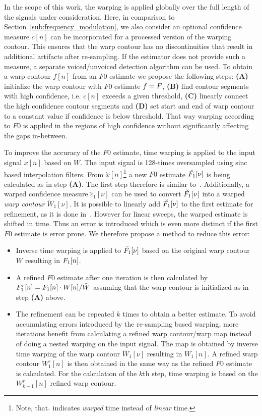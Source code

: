 In the scope of this work, the warping is applied globally over the full length of the signals under consideration. Here, in comparison to Section~\ref{sub:frequency_modulation}, we also consider an optional confidence measure $c[n]$ can be incorporated for a processed version of the warping contour. This ensures that the warp contour has no discontinuities that result in additional artifacts after re-sampling. If the estimator does not provide such a measure, a separate voiced/unvoiced detection algorithm can be used. To obtain a warp contour $f[n]$ from an $F0$ estimate we propose the following steps: \textbf{(A)} initialize the warp contour with $F0$ estimate $f = {F}$, \textbf{(B)} find contour segments with high confidence, i.e. $c[n]$ exceeds a given threshold, \textbf{(C)} linearly connect the high confidence contour segments and \textbf{(D)} set start and end of warp contour to a constant value if confidence is below threshold. That way warping according to $F0$ is applied in the regions of high confidence without significantly affecting the gaps in-between.
\par
To improve the accuracy of the $F0$ estimate, time warping is applied to the input signal $x[n]$ based on $W$. The input signal is 128-times oversampled using sinc based interpolation filters.
From $\breve{x}[n]$\footnote{Note, that $\breve{}$ indicates \emph{warped} time instead of \emph{linear} time.} a new $F0$ estimate $\breve{{F}_1}[\nu]$ is being calculated as in step \textbf{(A)}. The first step therefore is similar to~\cite{resch07}. Additionally, a warped confidence measure $\breve{c}_1[\nu]$ can be used to convert $\breve{{F}_1}[\nu]$ into a warped \emph{warp contour} $\breve{W}_1[\nu]$. It is possible to linearly add $\breve{{F}_1}[\nu]$ to the first estimate for refinement, as it is done in~\cite{azarov12}. However for linear sweeps, the warped estimate is shifted in time. Thus an error is introduced which is even more distinct if the first $F0$ estimate is error prone. We therefore propose a method to reduce this error:
\begin{itemize}
    \item Inverse time warping is applied to $\breve{{F}_1}[\nu]$ based on the original warp contour $W$ resulting in ${F}_1[n]$.
    \item A refined $F0$ estimate after one iteration is then calculated by ${F}_1^r[n] = {F}_1[n] \cdot W[n] / \bar{W}$ assuming that the warp contour is initialized as in step \textbf{(A)} above.
    \item The refinement can be repeated $k$ times to obtain a better estimate. To avoid accumulating errors introduced by the re-sampling based warping, more iterations benefit from calculating a refined warp contour/warp map instead of doing a nested warping on the input signal. The map is obtained by inverse time warping of the warp contour $\breve{W}_1[\nu]$ resulting in $W_1[n]$. A refined warp contour $W_1^r[n]$ is then obtained in the same way as the refined $F0$ estimate is calculated. For the calculation of the $k$th step, time warping is based on the $W_{k-1}^r[n]$ refined warp contour.
\end{itemize}
